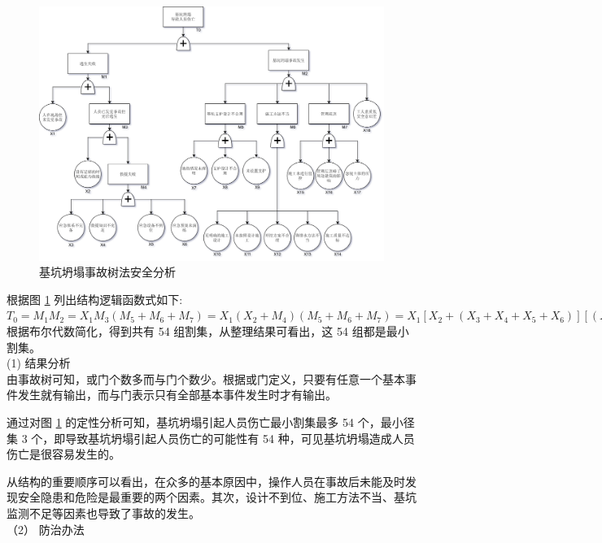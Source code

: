 \begin{figure}[thbp!]
    \centering
    \includegraphics[width=1.0\linewidth]{figure/c3f2.png}
    \caption{基坑坍塌事故树法安全分析}
    \label{fig:c3f1}
\end{figure}

根据图 \ref{fig:c3f1} 列出结构逻辑函数式如下:\\

$T_0=M_1M_2=X_1M_3(M_5+M_6+M_7)=X_1(X_2+M_4)(M_5+M_6+M_7)=X_1[X_2+(X_3+X_4+X_5+X_6)][(X_7+X_8+X_9)+(X_{10}+X_{11}+X_{12}+X_{13}+X_{14})+(X_{15}+X_{16}+X_{17})+X_{18}]$\\

根据布尔代数简化，得到共有 54 组割集，从整理结果可看出，这 54 组都是最小割集。\\

(1) 结果分析\\

 由事故树可知，或门个数多而与门个数少。根据或门定义，只要有任意一个基本事件发生就有输出，而与门表示只有全部基本事件发生时才有输出。

 通过对图 \ref{fig:c3f1} 的定性分析可知，基坑坍塌引起人员伤亡最小割集最多 54 个，最小径集 3 个，即导致基坑坍塌引起人员伤亡的可能性有 54 种，可见基坑坍塌造成人员伤亡是很容易发生的。

 从结构的重要顺序可以看出，在众多的基本原因中，操作人员在事故后未能及时发现安全隐患和危险是最重要的两个因素。其次，设计不到位、施工方法不当、基坑监测不足等因素也导致了事故的发生。\\

（2） 防治办法\\

